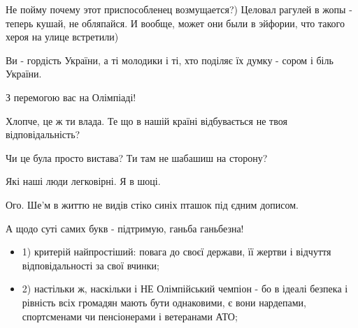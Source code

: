 \begin{itemize}
Не пойму почему этот приспособленец возмущается?) Целовал рагулей в жопы -
теперь кушай, не обляпайся. И вообще, может они были в эйфории, что такого
хероя на улице встретили)


 

Ви - гордість України, а ті молодики і ті, хто поділяє їх думку - сором і біль України.

З перемогою вас на Олімпіаді!


 

Хлопче, це ж ти влада. Те що в нашій країні відбувається не твоя
відповідальність?

Чи це була просто вистава? Ти там не шабашиш на сторону?

Які наші люди легковірні. Я в шоці.


 

Ого. Ше'м в життю не видів стіко синіх пташок під єдним дописом.

А щодо суті самих букв - підтримую, ганьба ганьбезна!

 

\begin{itemize}
\item 1) критерій найпростіший: повага до своєї держави, її жертви і відчуття
відповідальності за свої вчинки;

\item 2) настільки ж, наскільки і НЕ Олімпійський чемпіон - бо в ідеалі безпека і
рівність всіх громадян мають бути однаковими, є вони нардепами, спортсменами чи
пенсіонерами і ветеранами АТО;


\end{itemize}
\end{itemize}

